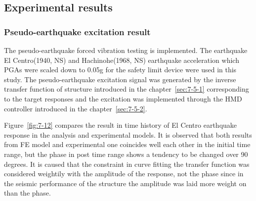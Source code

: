 \subsection{Experimental results}
\subsubsection{Pseudo-earthquake excitation result}
The pseudo-earthquake forced vibration testing is implemented. The earthquake El Centro(1940, NS) and Hachinohe(1968, NS) earthquake acceleration which PGAs were scaled down to 0.05g for the safety limit device were used in this study. The pseudo-earthquake excitation signal was generated by the inverse transfer function of structure introduced in the chapter~\ref{sec:7-5-1} corresponding to the target responses and the excitation was implemented through the HMD controller introduced in the chapter~\ref{sec:7-5-2}.

Figure~\ref{fig:7-12} compares the result in time history of El Centro earthquake response in the analysis and experimental models. It is observed that both results from FE model and experimental one coincides well each other in the initial time range, but the phase in post time range shows a tendency to be changed over 90 degrees. It is caused that the constraint in curve fitting the transfer function was considered weightily with the amplitude of the response, not the phase since in the seismic performance of the structure the amplitude was laid more weight on than the phase.

